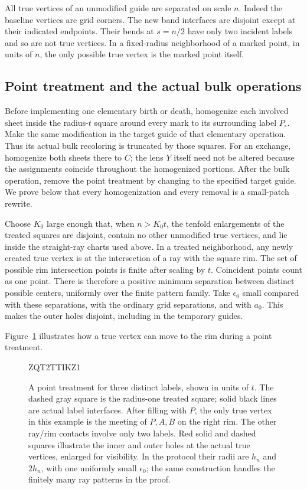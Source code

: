 \documentclass[11pt]{article}
\numberwithin{equation}{section}
\theoremstyle{definition}
\theoremstyle{remark}
\begin{document}
All true vertices of an unmodified guide are separated on scale $n$.
Indeed the baseline vertices are grid corners.  The new band interfaces
are disjoint except at their indicated endpoints.  Their bends at
$s=n/2$ have only two incident labels and so are not true vertices.
In a fixed-radius neighborhood of a marked point, in units of $n$,
the only possible true vertex is the marked point itself.

\subsection{Point treatment and the actual bulk operations}

Before implementing one elementary birth or death, homogenize each
involved sheet inside the radius-$t$ square around every mark to its
surrounding label $P_\circ$.  Make the same modification in the target
guide of that elementary operation.  Thus its actual bulk recoloring
is truncated by those squares.  For an exchange, homogenize both
sheets there to $C$; the lens $Y$ itself need not be altered because
the assignments coincide throughout the homogenized portions.  After
the bulk operation, remove the point treatment by changing to the
specified target guide.  We prove below that every homogenization and
every removal is a small-patch rewrite.

Choose $K_0$ large enough that, when $n>K_0t$, the tenfold enlargements
of the treated squares are disjoint, contain no other unmodified true
vertices, and lie inside the straight-ray charts used above.  In a
treated neighborhood, any newly created true vertex is at the
intersection of a ray with the square rim.  The set of possible rim
intersection points is finite after scaling by $t$.  Coincident
points count as one point.  There is therefore a positive minimum
separation between distinct possible centers, uniformly over the
finite pattern family.  Take $\epsilon_0$ small compared with these
separations, with the ordinary grid separations, and with $a_0$.
This makes the outer holes disjoint, including in the temporary guides.

Figure~\ref{fig:geometry-points} illustrates how a true vertex can
move to the rim during a point treatment.
\begin{figure}[tbp]

ZQT2TTIKZ1
\caption{A point treatment for three distinct labels, shown in units of
$t$.  The dashed gray square is the radius-one treated square; solid
black lines are actual label interfaces.  After filling with $P$, the
only true vertex in this example is the meeting of $P,A,B$ on the right
rim.  The other ray/rim contacts involve only two labels.  Red solid
and dashed squares illustrate the inner and outer holes at the actual
true vertices, enlarged for visibility.  In the protocol their radii are
$h_n$ and $2h_n$, with one uniformly small $\epsilon_0$; the same
construction handles the finitely many ray patterns in the proof.}
\label{fig:geometry-points}
\end{figure}
\end{document}
